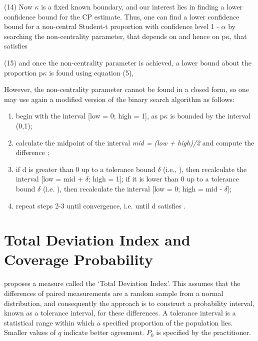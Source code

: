 \documentclass[12pt, a4paper]{report}
\theoremstyle{plain}
\theoremstyle{definition}
\theoremstyle{remark}
\begin{document}
	(14)
	Now $\kappa$ is a fixed known boundary, and our interest lies in finding a lower confidence bound for the CP estimate. 
	Thus, one can find a lower confidence bound for a non-central Student-t proportion with confidence level 1 - $\alpha$ by searching the non-centrality parameter, 
	that depends on  and hence on p$\kappa$, that satisfies
	
	(15)
	and once the non-centrality parameter  is achieved, a lower bound about the proportion p$\kappa$ is found using equation (5), 
	
	
	However, the non-centrality parameter cannot be found in a closed form, so one may use again a modified version of the binary search algorithm as follows:
	
	\begin{enumerate}
		\item begin with the interval [low = 0; high = 1], as p$\kappa$ is bounded by the interval (0,1);
		
		\item calculate the midpoint of the interval \textit{mid = (low + high)/2} and compute the difference ;
		
		\item if d is greater than 0 up to a tolerance bound $\delta$ (i.e., ), then recalculate the interval [low = mid + $\delta$; high = 1]; if it is 
		lower than 0 up to a tolerance bound $\delta$ (i.e. ), then recalculate the interval [low = 0; high = mid - $\delta$];
		
		\item repeat steps 2-3 until convergence, i.e. until d satisfies .
	\end{enumerate}
	
	
	
	
	
	\section{Total Deviation Index and Coverage Probability}
	
	
	\citet{lin2002} proposes a measure called the `Total Deviation Index'. 
	This assumes that the differences of paired measurements are a random sample from a normal distribution, 
	and consequently the approach is to construct a probability interval, known as a tolerance interval, 
	for these differences. A tolerance interval is a statistical range within which a specified proportion 
	of the population lies.
	Smaller values of $q$ indicate better agreement. $P_{0}$ is specified by the practitioner.
	
\end{document}
